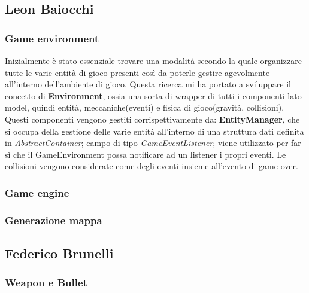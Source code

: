 
\newpage

\subsection*{Leon Baiocchi}

\subsubsection{Game environment}
Inizialmente è stato essenziale trovare una modalità secondo la quale organizzare tutte le varie
entità di gioco presenti così da poterle gestire agevolmente all'interno dell'ambiente di gioco.
Questa ricerca mi ha portato a sviluppare il concetto di \textbf{Environment}, ossia una sorta di wrapper di tutti i componenti lato model, quindi entità, meccaniche(eventi) e fisica di gioco(gravità, collisioni).
Questi componenti vengono gestiti corrispettivamente da: \textbf{EntityManager}, che si occupa della gestione delle varie entità all'interno di una struttura dati definita in \textit{AbstractContainer}; campo di tipo \textit{GameEventListener}, viene utilizzato per far sì che il GameEnvironment possa notificare ad un listener i propri eventi.
Le collisioni vengono considerate come degli eventi insieme all'evento di game over.

\subsubsection{Game engine}

\subsubsection{Generazione mappa}

\newpage

\subsection*{Federico Brunelli}

\subsubsection{Weapon e Bullet}

